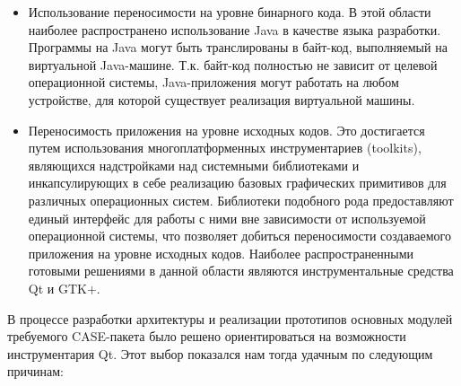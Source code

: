 \documentclass[a4paper]{article}
\newcommand\liststyleWWviiiNumxiv{%
\renewcommand\labelitemi{o}
\renewcommand\labelitemii{[F0B7?]}
\renewcommand\labelitemiii{[F0A7?]}
\renewcommand\labelitemiv{[F0B7?]}
}
\begin{document}
\liststyleWWviiiNumxiv
\begin{itemize}
\item {
Использование переносимости на уровне бинарного кода. В этой области
наиболее распространено использование \foreignlanguage{english}{Java} в
качестве языка разработки. Программы на Java могут быть транслированы в
байт-код, выполняемый на виртуальной
\foreignlanguage{english}{Java}{}-машине. Т.к. байт-код полностью не
зависит от целевой операционной системы, Java-приложения могут работать
на любом устройстве, для которой существует реализация виртуальной
машины. }
\item {
Переносимость приложения на уровне исходных кодов. Это достигается путем
использования многоплатформенных инструментариев
(\foreignlanguage{english}{toolkits}), являющихся надстройками над
системными библиотеками и инкапсулирующих в себе реализацию базовых
графических примитивов для различных операционных систем. Библиотеки
подобного рода предоставляют единый интерфейс для работы с ними вне
зависимости от используемой операционной системы, что позволяет
добиться переносимости создаваемого приложения на уровне исходных
кодов. Наиболее распространенными готовыми решениями в данной области
являются инструментальные средства \foreignlanguage{english}{Qt} и
\foreignlanguage{english}{GTK}+.}
\end{itemize}
{
В процессе разработки архитектуры и реализации прототипов основных
модулей требуемого \foreignlanguage{english}{CASE}{}-пакета было решено
ориентироваться на возможности инструментария
\foreignlanguage{english}{Qt}. Этот выбор показался нам тогда удачным
по следующим причинам:}
\end{document}
